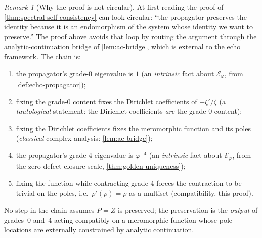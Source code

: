 \documentclass[11pt,a4paper]{article}
\theoremstyle{plain}
\theoremstyle{definition}
\theoremstyle{remark}
\newtheorem{remark}[theorem]{Remark}
\numberwithin{equation}{section}
\newcommand{\vp}{\varphi}
\begin{document}
\begin{remark}[Why the proof is not circular]
\label{rmk:why-not-circular}
At first reading the proof of
\cref{thm:spectral-self-consistency} can look circular: ``the
propagator preserves the identity because it is an endomorphism of
the system whose identity we want to preserve.''  The proof above
avoids that loop by routing the argument through the
analytic-continuation bridge of \cref{lem:ac-bridge}, which is
external to the echo framework.  The chain is:
\begin{enumerate}
  \item the propagator's grade-0 eigenvalue is \(1\)
    (an \emph{intrinsic} fact about \(\mathcal{E}_\vp\), from
    \cref{def:echo-propagator});
  \item fixing the grade-0 content fixes the Dirichlet coefficients
    of \(-\zeta'/\zeta\) (a \emph{tautological} statement: the
    Dirichlet coefficients \emph{are} the grade-0 content);
  \item fixing the Dirichlet coefficients fixes the meromorphic
    function and its poles (\emph{classical} complex analysis:
    \cref{lem:ac-bridge});
  \item the propagator's grade-4 eigenvalue is \(\vp^{-4}\)
    (an \emph{intrinsic} fact about \(\mathcal{E}_\vp\), from the
    zero-defect closure scale, \cref{thm:golden-uniqueness});
  \item fixing the function while contracting grade 4 forces the
    contraction to be trivial on the poles, i.e.\
    \(\rho'(\rho)=\rho\) as a multiset (compatibility, this proof).
\end{enumerate}
No step in the chain assumes \(P=Z\) is preserved; the preservation
is the \emph{output} of grades~0 and~4 acting compatibly on a
meromorphic function whose pole locations are externally
constrained by analytic continuation.
\end{remark}
\end{document}
